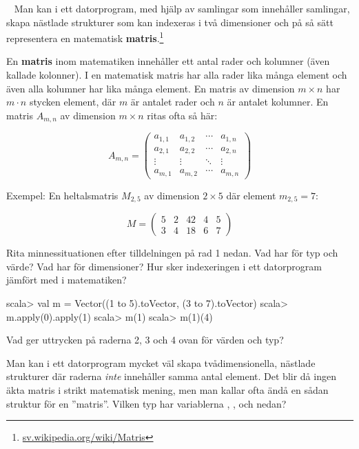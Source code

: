 \Task  \what~  Man kan i ett datorprogram, med hjälp av samlingar som innehåller samlingar, skapa nästlade strukturer som kan indexeras i två dimensioner och på så sätt representera en matematisk \textbf{matris}.\footnote{\href{https://sv.wikipedia.org/wiki/Matris}{sv.wikipedia.org/wiki/Matris}}
\begin{Background}
En \textbf{matris} inom matematiken innehåller ett antal rader och kolumner (även kallade kolonner). I en matematisk matris har alla rader lika många element och även alla kolumner har lika många element. En matris av dimension $m\times{}n$ har $m \cdot n$ stycken element, där $m$ är antalet rader och $n$ är antalet kolumner. En matris $A_{m,n}$ av dimension $m\times{}n$ ritas ofta så här:

\[
A_{m,n} =
 \begin{pmatrix}
  a_{1,1} & a_{1,2} & \cdots & a_{1,n} \\
  a_{2,1} & a_{2,2} & \cdots & a_{2,n} \\
  \vdots  & \vdots  & \ddots & \vdots  \\
  a_{m,1} & a_{m,2} & \cdots & a_{m,n}
 \end{pmatrix}
\]

\noindent Exempel: En heltalsmatris $M_{2,5}$ av dimension $2\times{}5$ där element $m_{2,5}=7$:

\[
M=
  \begin{pmatrix}
    5 & 2 & 42 & 4 & 5 \\
    3 & 4 & 18 & 6 & 7
  \end{pmatrix}
\]
\end{Background}

\Subtask\Pen Rita minnessituationen efter tilldelningen på rad 1 nedan. Vad har  för typ och värde? Vad har  för dimensioner? Hur sker indexeringen i ett datorprogram jämfört med i matematiken?

\begin{REPL}
scala> val m = Vector((1 to 5).toVector, (3 to 7).toVector)
scala> m.apply(0).apply(1)
scala> m(1)
scala> m(1)(4)
\end{REPL}

\Subtask Vad ger uttrycken på raderna 2, 3 och 4 ovan för värden och typ?

\Subtask Man kan i ett datorprogram mycket väl skapa tvådimensionella, nästlade strukturer där raderna \emph{inte} innehåller samma antal element. Det blir då ingen äkta matris i strikt matematisk mening, men man kallar ofta ändå en sådan struktur för en ''matris''. Vilken typ har variablerna , ,  och  nedan?

